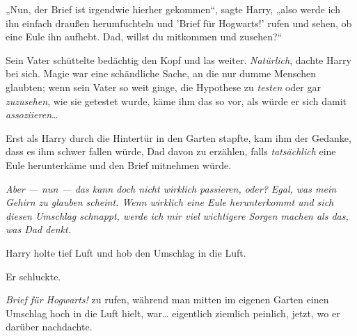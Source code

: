 „Nun, der Brief ist irgendwie hierher gekommen“, sagte Harry, „also werde ich ihn einfach draußen herumfuchteln und 'Brief für Hogwarts!' rufen und sehen, ob eine Eule ihn aufhebt. Dad, willst du mitkommen und zusehen?“

Sein Vater schüttelte bedächtig den Kopf und las weiter. \emph{Natürlich}, dachte Harry bei sich. Magie war eine schändliche Sache, an die nur dumme Menschen glaubten; wenn sein Vater so weit ginge, die Hypothese zu \emph{testen} oder gar \emph{zuzusehen}, wie sie getestet wurde, käme ihm das so vor, als würde er sich damit \emph{assoziieren}…

Erst als Harry durch die Hintertür in den Garten stapfte, kam ihm der Gedanke, dass es ihm schwer fallen würde, Dad davon zu erzählen, falls \emph{tatsächlich} eine Eule herunterkäme und den Brief mitnehmen würde.

\emph{Aber — nun — das kann doch nicht \emph{wirklich} passieren, oder? Egal, was mein Gehirn zu glauben scheint. Wenn wirklich eine Eule herunterkommt und sich diesen Umschlag schnappt, werde ich mir viel wichtigere Sorgen machen als das, was Dad denkt.}

Harry holte tief Luft und hob den Umschlag in die Luft.

Er schluckte.

\emph{Brief für Hogwarts!} zu rufen, während man mitten im eigenen Garten einen Umschlag hoch in die Luft hielt, war… eigentlich ziemlich peinlich, jetzt, wo er darüber nachdachte.

